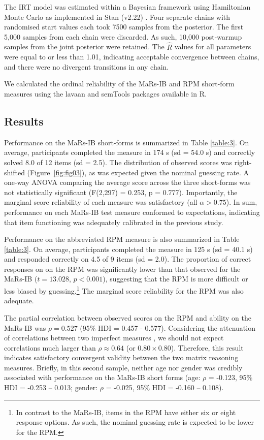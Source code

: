 \documentclass[a4paper,man,natbib]{apa6}
\begin{document}
The IRT model was estimated within a Bayesian framework using Hamiltonian Monte Carlo as implemented in Stan (v2.22) \citep{carpenter2017stan}. Four separate chains with randomised start values each took 7500 samples from the posterior. The first 5,000 samples from each chain were discarded. As such, 10,000 post-warmup samples from the joint posterior were retained. The $\hat{R}$ values for all parameters were equal to or less than 1.01, indicating acceptable convergence between chains, and there were no divergent transitions in any chain. 

We calculated the ordinal reliability of the MaRs-IB and RPM short-form measures using the lavaan \citep{lavaan} and semTools \citep{semtools} packages available in R.

\subsection{Results}

Performance on the MaRs-IB short-forms is summarized in Table \ref{table:3}. On average, participants completed the measure in 174 s (sd = 54.0 s) and correctly solved 8.0 of 12 items (sd = 2.5). The distribution of observed scores was right-shifted (Figure~\ref{fig:fig03}), as was expected given the nominal guessing rate. A one-way ANOVA comparing the average score across the three short-forms was not statistically significant (F(2,297) = 0.253, p = 0.777). Importantly, the marginal score reliability of each measure was satisfactory (all $\alpha > 0.75$). In sum, performance on each MaRs-IB test measure conformed to expectations, indicating that item functioning was adequately calibrated in the previous study.

Performance on the abbreviated RPM measure is also summarized in Table \ref{table:3}. On average, participants completed the measure in 125 s (sd = 40.1 s) and responded correctly on 4.5 of 9 items (sd = 2.0). The proportion of correct responses on on the RPM was significantly lower than that observed for the MaRs-IB ($t = 13.028$, $p < 0.001$), suggesting that the RPM is more difficult or less biased by guessing.\footnote{In contrast to the MaRs-IB, items in the RPM have either six or eight response options. As such, the nominal guessing rate is expected to be lower for the RPM.} The marginal score reliability for the RPM was also adequate.

The partial correlation between observed scores on the RPM and ability on the MaRs-IB was $\rho = 0.527$ (95\% HDI = 0.457 - 0.577). Considering the attenuation of correlations between two imperfect measures \citep{spearman1961proof}, we should not expect correlations much larger than $\rho \approx 0.64$ (or $0.80 \times 0.80$). Therefore, this result indicates satisfactory convergent validity between the two matrix reasoning measures. Briefly, in this second sample, neither age nor gender was credibly associated with performance on the MaRs-IB short forms (age: $\rho$ = -0.123, 95\% HDI = -0.253 -- 0.013; gender: $\rho$ = -0.025, 95\% HDI = -0.160 -- 0.108). 
\end{document}
